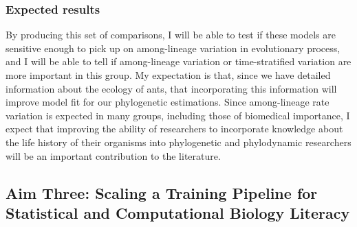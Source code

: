 \documentclass[]{article}
\begin{document}
\subsubsection*{Expected results}
By producing this set of comparisons, I will be able to test if these models are sensitive enough to pick up on among-lineage variation in evolutionary process, and I will be able to tell if among-lineage variation or time-stratified variation are more important in this group.
My expectation is that, since we have detailed information about the ecology of ants, that incorporating this information will improve model fit for our phylogenetic estimations.
Since among-lineage rate variation is expected in many groups, including those of biomedical importance, I expect that improving the ability of researchers to incorporate knowledge about the life history of their organisms into phylogenetic and phylodynamic researchers will be an important contribution to the literature.\par

\subsection*{Aim Three: Scaling a Training Pipeline for Statistical and Computational Biology Literacy}
\end{document}
